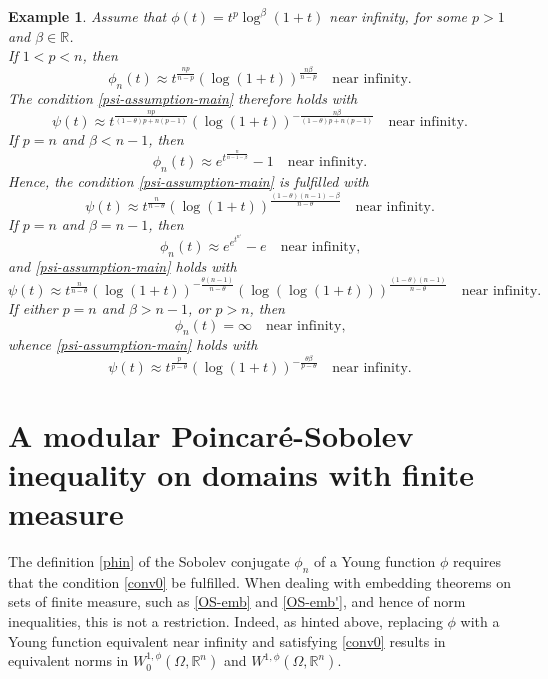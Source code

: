 \documentclass[leqno,11pt]{amsart}%
\numberwithin{equation}{section}
\def\Rn{{\mathbb R}^{n}}
\def\rn{\Rn}
\newtheorem{ex}[thm]{Example}
\theoremstyle{definition}
\numberwithin{equation}{section}
\begin{document}
\begin{ex} {\rm Assume that $\phi (t)=t^p \log^\beta (1+t)$ near infinity, for some $p>1$ and $\beta \in \mathbb R$.
\\ If $1<p<n$, then 
$$\phi_n (t) \approx t^{\frac{np}{n-p}}(\log (1+t))^{\frac{n\beta}{n-p}}\quad \text{near infinity.}$$
The condition \eqref{psi-assumption-main} therefore holds with
$$\psi (t) \approx t^{\frac{np}{({1-\theta}) p + n(p-1)}}(\log (1+t))^{-\frac{n\beta}{({1-\theta}) p + n(p-1)}}\quad \text{near infinity.}$$
If  $p=n$ and $\beta <n-1$, then
$$\phi_n (t) \approx e^{t^{\frac{n}{n-1-\beta}}}-1 \quad \text{near infinity.}$$
Hence, the condition \eqref{psi-assumption-main} is fulfilled with
$$\psi (t) \approx t^{\frac{n}{n -\theta}}(\log (1+t))^{\frac{({1-\theta})(n-1)-\beta}{n-\theta}}\quad \text{near infinity.}$$
If  $p=n$ and $\beta =n-1$, then
$$\phi_n (t) \approx e^{e^{t^{n'}}}-e \quad \text{near infinity,}$$
and \eqref{psi-assumption-main} holds with
$$\psi (t) \approx t^{\frac{n}{n -\theta}}(\log (1+t))^{-\frac{\theta (n-1)}{n-\theta}}(\log(\log (1+t)))^{\frac{({1-\theta})(n-1)}{n-\theta}}\quad \text{near infinity.}$$
If either $p=n$ and $\beta >n-1$, or $p>n$, then
$$\phi_n(t) = \infty \quad \text{near infinity,}$$
whence \eqref{psi-assumption-main} holds with
$$\psi (t) \approx t^{\frac{p}{p -\theta}}(\log (1+t))^{-\frac{\theta \beta}{p-\theta}}\quad \text{near infinity.}$$}


\end{ex}


\section{A modular Poincar\'e-Sobolev inequality  on domains with finite measure}\label{sec:SP}

The definition \eqref{phin} of the Sobolev conjugate $\phi_n$ of a Young function $\phi$ requires that the condition \eqref{conv0} be fulfilled. When dealing with embedding theorems on sets of finite measure, such as \eqref{OS-emb} and \eqref{OS-emb'}, and hence of norm inequalities, this is not a restriction. Indeed, as hinted above, replacing $\phi$ with a Young function equivalent near infinity and satisfying \eqref{conv0} results in equivalent norms in $W^{1,\phi}_0(\Omega, \rn)$ and $W^{1,\phi}(\Omega, \rn)$.
\end{document}
